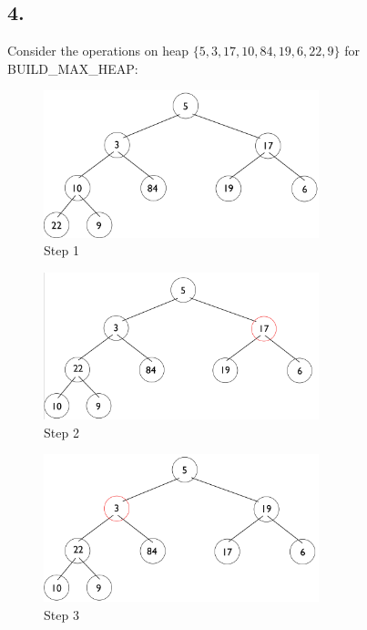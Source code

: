 \documentclass[11pt,letterpaper]{article}
\begin{document}
\pagebreak


\subsection*{4.}
Consider the operations on heap $ \{5, 3, 17, 10, 84, 19, 6, 22, 9\} $ for BUILD\_MAX\_HEAP:

\begin{figure}[!h]

	\begin{center}
	\includegraphics[width=80mm]{images/6_3_1_1_tree.png}
	\end{center}

\caption{Step 1 }
\end{figure}

\begin{figure}[!h]

	\begin{center}
	\includegraphics[width=80mm]{images/6_3_1_2_tree.png}
	\end{center}

\caption{Step 2 }
\end{figure}

\pagebreak

\begin{figure}[!h]

	\begin{center}
	\includegraphics[width=80mm]{images/6_3_1_3_tree.png}
	\end{center}

\caption{Step 3 }
\end{figure}
\end{document}
